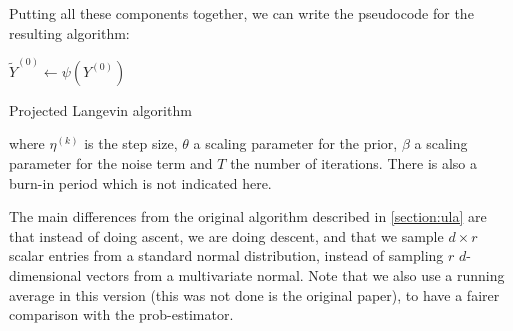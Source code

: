 \documentclass[12pt]{memoir}
\begin{document}
Putting all these components together, we can write the pseudocode for the resulting algorithm:\medbreak


\begin{algorithm}[H]

    \DontPrintSemicolon







    $\tilde Y^{(0)} \gets \psi(Y^{(0)})$\;


    \caption{Projected Langevin algorithm}

\end{algorithm}\medbreak

where $\eta^{(k)}$ is the step size, $\theta$ a scaling parameter for the prior, $\beta$ a scaling parameter for the noise term and $T$ the number of iterations. There is also a burn-in period which is not indicated here.\medbreak

The main differences from the original algorithm described in \ref{section:ula} are that instead of doing ascent, we are doing descent, and that we sample $ d\times r$ scalar entries from a standard normal distribution, instead of sampling $r$ $d$-dimensional vectors from a multivariate normal. Note that we also use a running average in this version (this was not done is the original paper), to have a fairer comparison with the prob-estimator.\medbreak
\end{document}
